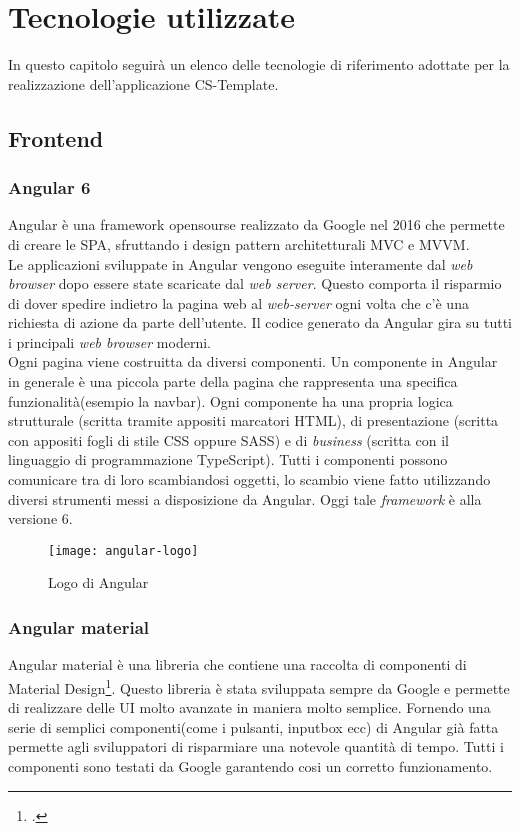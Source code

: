 
\chapter{Tecnologie utilizzate}
\label{cap:Tecnologie utilizzate}
In questo capitolo seguirà un elenco delle tecnologie di riferimento adottate per la realizzazione dell'applicazione CS-Template.
\section{Frontend}
\subsection{Angular 6}
Angular è una \gls{framework} opensourse realizzato da Google nel 2016 che permette di creare le \gls{SPA}, sfruttando i \gls{design
	pattern} architetturali \gls{MVC} e \gls{MVVM}.
\\

Le applicazioni sviluppate in Angular vengono eseguite interamente dal \emph{web browser} dopo essere state scaricate dal \emph{web server}. Questo comporta il risparmio di dover spedire indietro la pagina web al \emph{web-server} ogni volta che c'è una richiesta di azione da parte dell'utente. Il codice generato da Angular gira su tutti i principali \emph{web browser} moderni.
\\

Ogni pagina viene costruitta da diversi componenti. Un componente in Angular in generale è una piccola parte della pagina che rappresenta una specifica funzionalità(esempio la navbar).   Ogni componente ha una propria logica
strutturale (scritta tramite appositi marcatori HTML), di presentazione (scritta con
appositi fogli di stile CSS oppure SASS) e di \emph{business} (scritta con il linguaggio di programmazione
TypeScript). Tutti i componenti possono comunicare tra di loro scambiandosi
oggetti, lo scambio viene fatto utilizzando diversi strumenti messi a disposizione da Angular. Oggi tale \emph{framework} è alla versione 6.
\begin{figure}[!h] 
	\centering 
	\texttt{[image: angular-logo]} 
	\caption{Logo di Angular}
\end{figure}

\subsection{Angular material}
Angular material è una libreria che contiene una raccolta di componenti di Material Design\footcite{https://material.io/design/}. Questo libreria è stata sviluppata sempre da Google e permette di realizzare delle \gls{UI} molto avanzate in maniera molto semplice. Fornendo una serie di semplici componenti(come i pulsanti, inputbox ecc) di Angular già fatta permette agli sviluppatori di risparmiare una notevole quantità di tempo. Tutti i componenti sono testati da Google garantendo cosi un corretto funzionamento.

